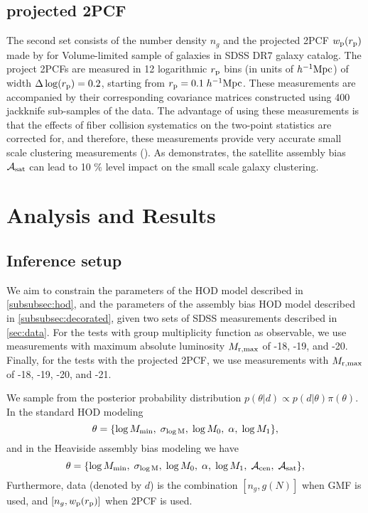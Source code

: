 \documentclass[12pt, preprint]{emulateapj}
\newcommand{\beq}{\begin{equation}}
\newcommand{\eeq}{\end{equation}}
\newcommand{\mzero}{\log M_{0}}
\newcommand{\mone}{\log M_{1}}
\newcommand{\mmin}{\log M_{\rm min}}
\newcommand{\sigmam}{\sigma_{\log \rm M}}
\newcommand{\acen}{\mathcal{A}_{\rm cen}}
\newcommand{\asat}{\mathcal{A}_{\rm sat}}
\begin{document}
\subsection{projected 2PCF}

The second set consists of the number density $n_{g}$ and the projected 2PCF $w_{\rm{p}}(r_{\rm{p}})$ made by \citealt{guo2015} for Volume-limited sample of galaxies in SDSS DR7 galaxy catalog. The project 2PCFs are measured in 12 logarithmic $r_{\rm p}$ bins (in units of $h^{-1}\rm{Mpc}$) of width $\Delta \log(r_{\rm p}) = 0.2$, starting from $r_{\rm{p}} = 0.1 \; h^{-1}\rm{Mpc}$. These measurements are accompanied by their corresponding covariance matrices constructed using 400 jackknife sub-samples of the data. The advantage of using these measurements is that the effects of fiber collision systematics on the two-point statistics are corrected for, and therefore, these measurements provide very accurate small scale clustering measurements (\citealt{guo2012,guo2015}). As \citealt{hearin15} demonstrates, the satellite assembly bias $\mathcal{A}_{\rm sat}$ can lead to 10 $\%$ level impact on the small scale galaxy clustering.  

\section{Analysis and Results}

\subsection{Inference setup}

We aim to constrain the parameters of the HOD model described in \ref{subsubsec:hod}, and the parameters of the assembly bias HOD model described in \ref{subsubsec:decorated}, given two sets of SDSS measurements described in \ref{sec:data}. For the tests with group multiplicity function as observable, we use measurements with maximum absolute luminosity $M_{\rm r , max}$ of -18, -19, and -20. Finally, for the tests with the projected 2PCF, we use measurements with $M_{\rm r , max}$ of -18, -19, -20, and -21.  

We sample from the posterior probability distribution $p(\theta|d) \propto p(d|\theta) \pi(\theta)$. In the standard HOD modeling 
\beq
\theta = \{ \mmin, \; \sigmam, \; \mzero, \; \alpha, \; \mone \},
\eeq
and in the Heaviside assembly bias modeling we have 
\beq
\theta = \{ \mmin, \; \sigmam, \; \mzero, \; \alpha, \; \mone, \; \acen, \; \asat \},
\eeq
Furthermore, data (denoted by $d$) is the combination $[n_{g},g(N)]$ when GMF is used, and $[n_{g}, w_{\rm{p}}(r_{\rm{p}})]$ when 2PCF is used.
\end{document}

